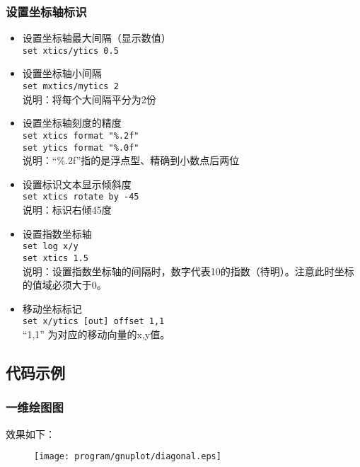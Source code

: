 \subsubsection{设置坐标轴标识}
\begin{itemize}
\item 设置坐标轴最大间隔（显示数值）\\
\verb|set xtics/ytics 0.5|

\item 设置坐标轴小间隔\\
\verb|set mxtics/mytics 2|\\
说明：将每个大间隔平分为2份

\item 设置坐标轴刻度的精度\\
\verb|set xtics format "%.2f"|\\
\verb|set ytics format "%.0f"|\\
说明：“\%.2f”指的是浮点型、精确到小数点后两位

\item 设置标识文本显示倾斜度\\
\verb|set xtics rotate by -45|\\
说明：标识右倾45度

\item 设置指数坐标轴\\
\verb|set log x/y|\\
\verb|set xtics 1.5|\\
说明：设置指数坐标轴的间隔时，数字代表10的指数（待明）。注意此时坐标的值域必须大于0。

\item 移动坐标标记\\
\verb|set x/ytics [out] offset 1,1|\\
“1,1” 为对应的移动向量的x,y值。
\end{itemize}



\subsection{代码示例}
\subsubsection{一维绘图图}

效果如下：
\begin{figure}[htb]
\centering
\texttt{[image: program/gnuplot/diagonal.eps]}
\end{figure}



